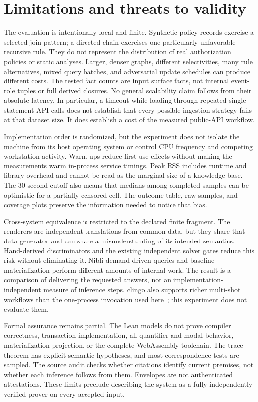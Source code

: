 \section{Limitations and threats to validity}
\label{sec:limitations}

The evaluation is intentionally local and finite. Synthetic policy records
exercise a selected join pattern; a directed chain exercises one particularly
unfavorable recursive rule. They do not represent the distribution of real
authorization policies or static analyses. Larger, denser graphs, different
selectivities, many rule alternatives, mixed query batches, and adversarial
update schedules can produce different costs. The tested fact counts are input
surface facts, not internal event-role tuples or full derived closures.
No general scalability claim follows from their absolute latency.
In particular, a timeout while loading through repeated single-statement API
calls does not establish that every possible ingestion strategy fails at that
dataset size. It does establish a cost of the measured public-API workflow.

Implementation order is randomized, but the experiment does not isolate the
machine from its host operating system or control CPU frequency and competing
workstation activity. Warm-ups reduce first-use effects without making the
measurements warm in-process service timings. Peak RSS includes runtime and
library overhead and cannot be read as the marginal size of a knowledge base.
The 30-second cutoff also means that medians among completed samples can be
optimistic for a partially censored cell. The outcome table, raw samples, and
coverage plots preserve the information needed to notice that bias.

Cross-system equivalence is restricted to the declared finite fragment.
The renderers are independent translations from common data, but they share
that data generator and can share a misunderstanding of its intended semantics.
Hand-derived discriminators and the existing independent solver gates reduce
this risk without eliminating it. Nibli demand-driven queries and baseline
materialization perform different amounts of internal work. The result is a
comparison of delivering the requested answers, not an implementation-independent
measure of inference steps. clingo also supports richer multi-shot workflows
than the one-process invocation used here~\cite{clingo}; this experiment does
not evaluate them.

Formal assurance remains partial. The Lean models do not prove compiler
correctness, transaction implementation, all quantifier and modal behavior,
materialization projection, or the complete WebAssembly toolchain.
The trace theorem has explicit semantic hypotheses, and most correspondence
tests are sampled. The source audit checks whether citations identify current
premises, not whether each inference follows from them. Envelopes are not
authenticated attestations. These limits preclude describing the system as a
fully independently verified prover on every accepted input.

